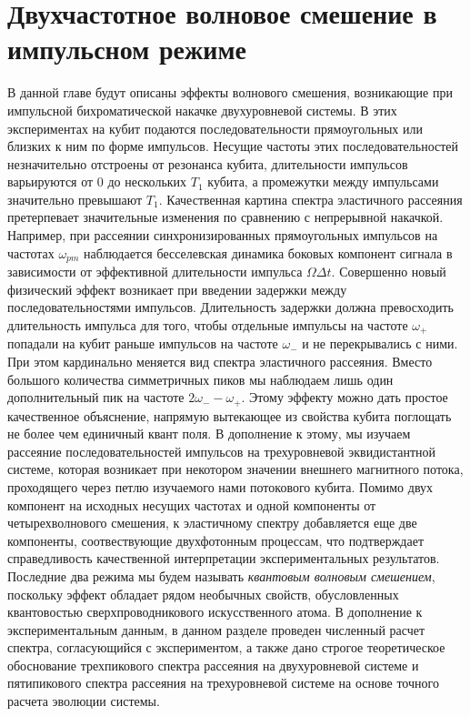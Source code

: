 \chapter{Двухчастотное волновое смешение в импульсном режиме}
\label{ch: q_mixing}

В данной главе будут описаны эффекты волнового смешения, возникающие при импульсной бихроматической накачке двухуровневой системы. В этих экспериментах на кубит подаются последовательности прямоугольных или близких к ним по форме импульсов. Несущие частоты этих последовательностей незначительно отстроены от резонанса кубита, длительности импульсов варьируются от $0$ до нескольких $T_1$ кубита, а промежутки между импульсами значительно превышают $T_1$. Качественная картина спектра эластичного рассеяния претерпевает значительные изменения по сравнению с непрерывной накачкой. Например, при рассеянии синхронизированных прямоугольных импульсов на частотах $\omega_{pm}$ наблюдается бесселевская динамика боковых компонент сигнала в зависимости от эффективной длительности импульса $\Omega\Delta t$. Совершенно новый физический эффект возникает при введении задержки между последовательностями импульсов. Длительность задержки должна превосходить длительность импульса для того, чтобы отдельные импульсы на частоте $\omega_+$ попадали на кубит раньше импульсов на частоте $\omega_-$ и не перекрывались с ними. При этом кардинально меняется вид спектра эластичного рассеяния. Вместо большого количества симметричных пиков мы наблюдаем лишь один дополнительный пик на частоте $2\omega_--\omega_+$. Этому эффекту можно дать простое качественное объяснение, напрямую вытекающее из свойства кубита поглощать не более чем единичный квант поля. В дополнение к этому, мы изучаем рассеяние последовательностей импульсов на трехуровневой эквидистантной системе, которая возникает при некотором значении внешнего магнитного потока, проходящего через петлю изучаемого нами потокового кубита. Помимо  двух компонент на исходных несущих частотах и одной компоненты от четырехволнового смешения, к эластичному спектру добавляется еще две компоненты, соотвествующие двухфотонным процессам, что подтверждает справедливость качественной интерпретации экспериментальных результатов. Последние два режима мы будем называть \textit{квантовым волновым смешением}, поскольку эффект
обладает рядом необычных свойств, обусловленных квантовостью сверхпроводникового искусственного атома. В дополнение к экспериментальным данным, в данном разделе проведен численный расчет спектра, согласующийся с экспериментом, а также дано строгое теоретическое обоснование трехпикового спектра рассеяния на двухуровневой системе и пятипикового спектра рассеяния на трехуровневой системе на основе точного расчета эволюции системы.  
